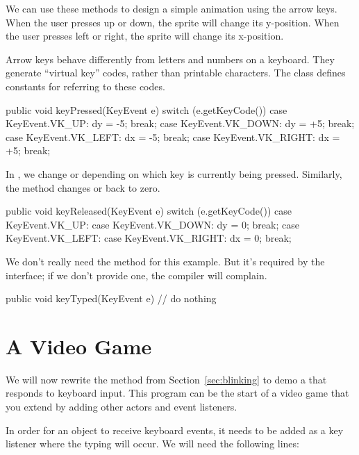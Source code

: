 We can use these methods to design a simple animation using the arrow keys.
When the user presses up or down, the sprite will change its y-position.
When the user presses left or right, the sprite will change its x-position.

Arrow keys behave differently from letters and numbers on a keyboard.
They generate ``virtual key'' codes, rather than printable characters.
The  class defines constants for referring to these codes.

\begin{code}
public void keyPressed(KeyEvent e) {
    switch (e.getKeyCode()) {
        case KeyEvent.VK_UP:
            dy = -5;
            break;
        case KeyEvent.VK_DOWN:
            dy = +5;
            break;
        case KeyEvent.VK_LEFT:
            dx = -5;
            break;
        case KeyEvent.VK_RIGHT:
            dx = +5;
            break;
    }
}
\end{code}

In , we change  or  depending on which key is currently being pressed.
Similarly, the  method changes  or  back to zero.

\begin{code}
public void keyReleased(KeyEvent e) {
    switch (e.getKeyCode()) {
        case KeyEvent.VK_UP:
        case KeyEvent.VK_DOWN:
            dy = 0;
            break;
        case KeyEvent.VK_LEFT:
        case KeyEvent.VK_RIGHT:
            dx = 0;
            break;
    }
}
\end{code}

We don't really need the  method for this example.
But it's required by the interface; if we don't provide one, the compiler will complain.

\begin{code}
public void keyTyped(KeyEvent e) {
    // do nothing
}
\end{code}


\section{A Video Game}

We will now rewrite the  method from Section~\ref{sec:blinking} to demo a  that responds to keyboard input.
This program can be the start of a video game that you extend by adding other actors and event listeners.

In order for an object to receive keyboard events, it needs to be added as a key listener where the typing will occur.
We will need the following lines:

